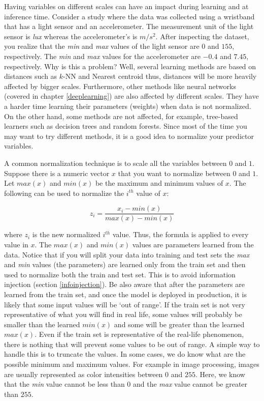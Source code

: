 \documentclass[
  11pt,
]{krantz}
\begin{document}
Having variables on different scales can have an impact during learning and at inference time. Consider a study where the data was collected using a wristband that has a light sensor and an accelerometer. The measurement unit of the light sensor is \emph{lux} whereas the accelerometer's is \(m/s^2\). After inspecting the dataset, you realize that the \emph{min} and \emph{max} values of the light sensor are \(0\) and \(155\), respectively. The \emph{min} and \emph{max} values for the accelerometer are \(-0.4\) and \(7.45\), respectively. Why is this a problem? Well, several learning methods are based on distances such as \(k\)-NN and Nearest centroid thus, distances will be more heavily affected by bigger scales. Furthermore, other methods like neural networks (covered in chapter \ref{deeplearning}) are also affected by different scales. They have a harder time learning their parameters (weights) when data is not normalized. On the other hand, some methods are not affected, for example, tree-based learners such as decision trees and random forests. Since most of the time you may want to try different methods, it is a good idea to normalize your predictor variables.

A common normalization technique is to scale all the variables between \(0\) and \(1\). Suppose there is a numeric vector \(x\) that you want to normalize between \(0\) and \(1\). Let \(max(x)\) and \(min(x)\) be the maximum and minimum values of \(x\). The following can be used to normalize the \(i^{th}\) value of \(x\):

\begin{equation}
  z_i = \frac{x_i - min(x)}{max(x)-min(x)}
\end{equation}

where \(z_i\) is the new normalized \(i^{th}\) value. Thus, the formula is applied to every value in \(x\). The \(max(x)\) and \(min(x)\) values are parameters learned from the data. Notice that if you will split your data into training and test sets the \emph{max} and \emph{min} values (the parameters) are learned only from the train set and then used to normalize both the train and test set. This is to avoid information injection (section \ref{infoinjection}). Be also aware that after the parameters are learned from the train set, and once the model is deployed in production, it is likely that some input values will be `out of range'. If the train set is not very representative of what you will find in real life, some values will probably be smaller than the learned \(min(x)\) and some will be greater than the learned \(max(x)\). Even if the train set is representative of the real-life phenomenon, there is nothing that will prevent some values to be out of range. A simple way to handle this is to truncate the values. In some cases, we do know what are the possible minimum and maximum values. For example in image processing, images are usually represented as color intensities between \(0\) and \(255\). Here, we know that the \emph{min} value cannot be less than \(0\) and the \emph{max} value cannot be greater than \(255\).
\end{document}
